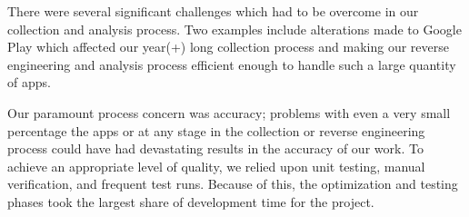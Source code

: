 \documentclass{sig-alternate-05-2015}
\begin{document}



There were several significant challenges which had to be overcome in our collection and analysis process. Two examples include alterations made to Google Play which affected our year(+) long collection process and making our reverse engineering and analysis process efficient enough to handle such a large quantity of apps.

Our paramount process concern was accuracy; problems with even a very small percentage the apps or at any stage in the collection or reverse engineering process could have had devastating results in the accuracy of our work. To achieve an appropriate level of quality, we relied upon unit testing, manual verification, and frequent test runs. Because of this, the optimization and testing phases took the largest share of development time for the project.
\end{document}
